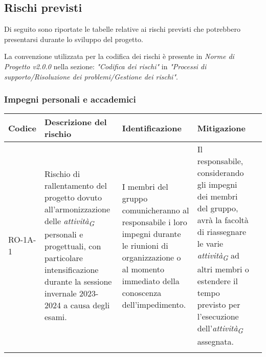 \subsection{Rischi previsti}
Di seguito sono riportate le tabelle relative ai rischi previsti che potrebbero presentarsi durante lo sviluppo del progetto.  

La convenzione utilizzata per la codifica dei rischi è presente in \textit{Norme di Progetto v2.0.0} nella sezione: \textit{"Codifica dei rischi"} in \textit{"Processi di supporto/Risoluzione dei problemi/Gestione dei rischi"}.  


\subsubsection{Impegni personali e accademici}\label{sec:ImpPersonali}
\begin{table}[H]
    \centering
    \begin{tabularx}{\textwidth}{l>{\RaggedRight}X>{\RaggedRight}X>{\RaggedRight}X>{\RaggedRight}X}
    \toprule
    \rowcolor{gray!50}
    \textbf{Codice} & \textbf{Descrizione del rischio} & \textbf{Identificazione} & \textbf{Mitigazione} \\
    \midrule
    \addlinespace 
    RO-1A-1 & 
    Rischio di rallentamento del progetto dovuto all'armonizzazione delle \textit{attività}\textsubscript{\textit{G}} personali e progettuali, con particolare intensificazione durante la sessione invernale 2023-2024 a causa degli esami. & 
    I membri del gruppo comunicheranno al responsabile i loro impegni durante le riunioni di organizzazione o al momento immediato della conoscenza dell'impedimento. & 
    Il responsabile, considerando gli impegni dei membri del gruppo, avrà la facoltà di riassegnare le varie \textit{attività}\textsubscript{\textit{G}} ad altri membri o estendere il tempo previsto per l'esecuzione dell'\textit{attività}\textsubscript{\textit{G}} assegnata.\\  
    \bottomrule
    \addlinespace 
    \end{tabularx}
\end{table}

\pagebreak

